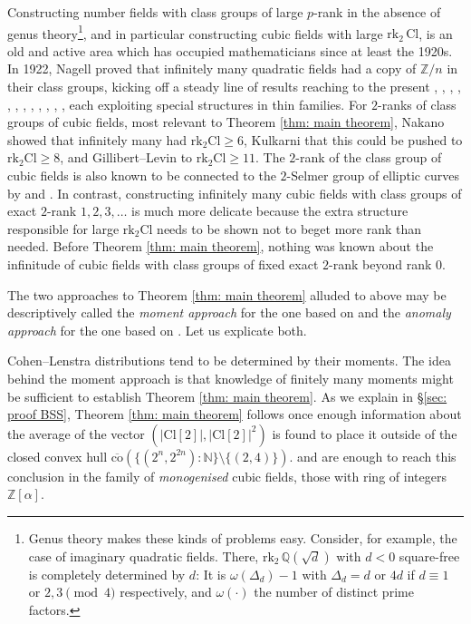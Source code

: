 \documentclass[a4paper, 12pt]{amsart}
\newcommand{\rk}{\mathrm{rk}}
\newcommand{\Cl}{\mathrm{Cl}}
\begin{document}
Constructing number fields with class groups of large $p$-rank in the absence of genus theory\footnote{Genus theory makes these kinds of problems easy. Consider, for example, the case of imaginary quadratic fields. There, $\rk_2 \,\mathbb{Q}(\sqrt{d})$ with $d < 0$ square-free is completely determined by $d$: It is $\omega(\Delta_d)-1$ with $\Delta_d = d$ or $4d$ if $d \equiv 1$ or $2,3 \pmod{4}$ respectively, and $\omega(\cdot)$ the number of distinct prime factors.}, and in particular constructing cubic fields with large $\rk_2 \, \Cl$, is an old and active area which has occupied mathematicians since at least the 1920s. In 1922, Nagell proved that infinitely many quadratic fields had a copy of $\mathbb{Z}/n$ in their class groups, kicking off a steady line of results reaching to the present \cite{MR3069394}, \cite{MR85301}, \cite{MR79613},  \cite{MR236144}, \cite{MR360518}, \cite{MR797674}, \cite{MR864264}, \cite{MR866122}, \cite{MR1875340}, \cite{MR2590188}, \cite{MR3749365}, \cite{MR4033251},
each exploiting special structures in thin families. For $2$-ranks of class groups of cubic fields, most relevant to Theorem \ref{thm: main theorem}, Nakano \cite{MR937193} showed that infinitely many had $\rk_2 \Cl \ge 6$, Kulkarni \cite{MR3749365} that this could be pushed to $\rk_2 \Cl \ge 8$, and Gillibert--Levin \cite{MR4033251} to $\rk_2 \Cl \ge 11$. The $2$-rank of the class group of cubic fields is also known to be connected to the $2$-Selmer group of elliptic curves by \cite{MR480416} and \cite{MR1432782}. 
In contrast, constructing infinitely many cubic fields with class groups of exact $2$-rank $1,2,3,\ldots$ is much more delicate because the extra structure responsible for large $\rk_2 \Cl$ needs to be shown not to beget more rank than needed. Before Theorem \ref{thm: main theorem}, nothing was known about the infinitude of cubic fields with class groups of fixed exact $2$-rank beyond rank $0$.

The two approaches to Theorem \ref{thm: main theorem} alluded to above may be descriptively called the \textit{moment approach} for the one based on \cite{2506.05539} and the \textit{anomaly approach} for the one based on \cite{MR4891959}. Let us explicate both.

Cohen--Lenstra distributions tend to be determined by their moments. The idea behind the moment approach is that knowledge of finitely many moments might be sufficient to establish Theorem \ref{thm: main theorem}. As we explain in \S \ref{sec: proof BSS}, Theorem \ref{thm: main theorem} follows once enough information about the average of the vector $(\lvert \Cl[2]\rvert,\lvert \Cl[2]\rvert^2)$ is found to place it outside of the closed convex hull $\overline{\mathrm{co}}(\{(2^n,2^{2n}): \mathbb{N}\} \setminus \{(2,4)\})$. \cite[Theorem 4]{BHSpreprint} and \cite[Theorem 1.2]{2506.05539} are enough to reach this conclusion in the family of \textit{monogenised} cubic fields, those with ring of integers $\mathbb{Z}[\alpha]$. 
\end{document}
